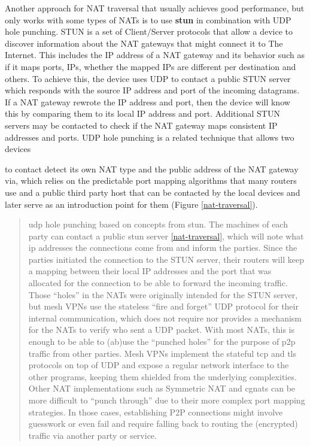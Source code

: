 Another approach for NAT traversal that usually achieves good
performance, but only works with some types of NATs is to use
\textbf{\gls{stun}} in combination with UDP hole punching. STUN is a set
of Client/Server protocols that allow a device to discover information
about the NAT gateways that might connect it to The Internet. This
includes the IP address of a NAT gateway and its behavior such as if it
maps ports, IPs, whether the mapped IPs are different per destination
and others. To achieve this, the device uses UDP to contact a public
STUN server which responds with the source IP address and port of the
incoming datagrams. If a NAT gateway rewrote the IP address and port,
then the device will know this by comparing them to its local IP address
and port. Additional STUN servers may be contacted to check if the NAT
gateway maps consistent IP addresses and ports. UDP hole punching is a
related technique that allows two devices

to contact detect its own NAT type and the public address of the NAT
gateway via, which relies on the predictable port mapping algorithms
that many routers use and a public third party host that can be
contacted by the local devices and later serve as an introduction point
for them (Figure \ref{nat-traversal}).


\begin{quote}
\gls{udp} hole punching based on concepts from \gls{stun}. The machines
of each party can contact a public \gls{stun} server
\ref{nat-traversal}, which will note what \gls{ip} addresses the
connections come from and inform the parties. Since the parties
initiated the connection to the STUN server, their routers will keep a
mapping between their local IP addresses and the port that was allocated
for the connection to be able to forward the incoming traffic. Those
``holes'' in the NATs were originally intended for the STUN server, but
mesh VPNs use the stateless ``fire and forget'' UDP protocol for their
internal communication, which does not require nor provides a mechanism
for the NATs to verify who sent a UDP packet. With most NATs, this is
enough to be able to (ab)use the ``punched holes'' for the purpose of
\gls{p2p} traffic from other parties. Mesh VPNs implement the stateful
\gls{tcp} and \gls{tls} protocols on top of UDP and expose a regular
network interface to the other programs, keeping them shielded from the
underlying complexities. Other NAT implementations such as Symmetric NAT
and \glspl{cgnat} can be more difficult to ``punch through'' due to
their more complex port mapping strategies. In those cases, establishing
P2P connections might involve guesswork or even fail and require falling
back to routing the (encrypted) traffic via another party or service.
\end{quote}

